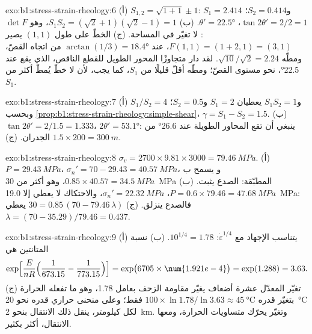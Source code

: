\begin{solution}{exo:b1:stress-strain-rheology:6}
(أ) $S_{1,2} = \sqrt{1 + 1} \pm 1$: $S_1 = 2.414$ و$S_2 = 0.414$؛
$\tan2\theta' = 2/2 = 1$، $\theta' = \ang{22.5}$. (ب) $S_1S_2 =
(\sqrt2 + 1)(\sqrt2 - 1) = 1$، وهو $\det F$: لا تغيّر في المساحة. (ج) الخطّ على طول
$(1, 1)$ يصير $F(1, 1) = (1 + 2, 1) = (3, 1)$، عند
$\arctan(1/3) = \ang{18.4}$ من اتجاه القصّ، ومطّه
$\sqrt{10}/\sqrt2 = 2.24$. لقد دار متجاوزًا المحور الطويل للقطع الناقص، الذي
يقع عند \ang{22.5}، نحو مستوى القصّ؛ ومطّه أقلّ قليلًا من $S_1$، كما يجب، لأن
لا خطّ يُمطّ أكثر من $S_1$.
\end{solution}

\begin{solution}{exo:b1:stress-strain-rheology:7}
(أ) $S_1/S_2 = 4$ و$S_1S_2 = 1$ يعطيان $S_1 = 2$ و$S_2 = 0.5$؛ وبحسب
\cref{prop:b1:stress-strain-rheology:simple-shear}، $\gamma = S_1 - S_2 =
1.5$. (ب) $\tan2\theta' = 2/1.5 = 1.333$، $2\theta' = \ang{53.1}$: ينبغي أن تقع
المحاور الطويلة عند \ang{26.6} من الجدران. (ج) $1.5\times200 = \qty{300}{m}$.
\end{solution}

\begin{solution}{exo:b1:stress-strain-rheology:8}
$\sigma_v = 2700\times9.81\times3000 = \qty{79.46}{MPa}$. (أ) $P = \qty{29.43}{MPa}$،
$\sigma_n' = 70 - 29.43 = \qty{40.57}{MPa}$، و
 يسمح ب$0.85\times40.57 = \qty{34.5}{MPa}$، وهو أكثر من \qty{30}{MPa} المطبّقة: الصدع
يثبت. (ب) $P = 0.6\times79.46 = \qty{47.68}{MPa}$، $\sigma_n' =
\qty{22.32}{MPa}$، والاحتكاك لا يعطي إلا \qty{19.0}{MPa}: فالصدع
ينزلق. (ج) $30 = 0.85\,(70 - 79.46\,\lambda)$ يعطي $\lambda = (70 -
35.29)/79.46 = 0.437$.
\end{solution}

\begin{solution}{exo:b1:stress-strain-rheology:9}
(أ) يتناسب الإجهاد مع $\dot\varepsilon^{1/4}$: $10^{1/4} = 1.78$. (ب) نسبة
المتانتين هي
\[
  \exp\Bigl[\frac{E}{nR}\Bigl(\frac{1}{673.15} - \frac{1}{773.15}\Bigr)\Bigr]
  = \exp\bigl(6705\times\num{1.921e-4}\bigr) = \exp(1.288) = 3.63 .
\]
(ج) تغيّر المعدّل عشرة أضعاف يغيّر مقاومة الزحف بعامل 1.78، وهو ما تفعله الحرارة بتغيّر قدره
$100\times\ln1.78/\ln3.63 \approx
\qty{45}{\degreeCelsius}$ فقط؛ وعلى منحنى حراري قدره نحو \qty{20}{\degreeCelsius}
لكل كيلومتر، ينقل ذلك الانتقال بنحو \qty{2}{km}. وتغيّر
 يحرّك متساويات الحرارة، ومعها الانتقال، أكثر بكثير.
\end{solution}

